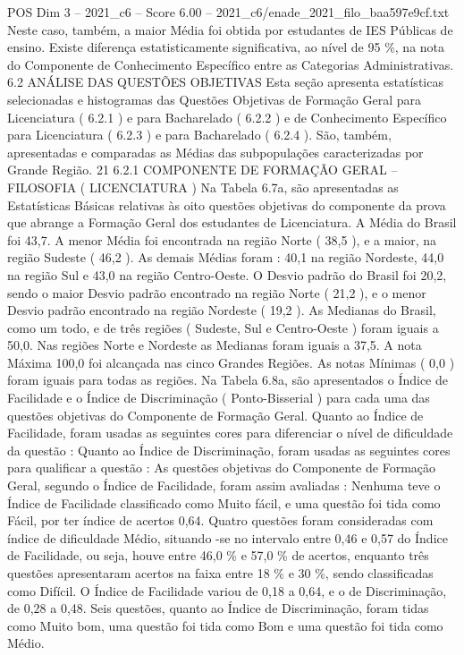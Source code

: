 \begin{textsample}{POS Dim 3 – 2021\_c6 – Score 6.00 – 2021\_c6/enade\_2021\_filo\_baa597e9cf.txt}
Neste caso, também, a maior Média foi obtida por estudantes de IES Públicas de ensino.
Existe diferença estatisticamente significativa, ao nível de 95 \%, na nota do Componente de Conhecimento Específico entre as Categorias Administrativas. 6.2 ANÁLISE DAS QUESTÕES OBJETIVAS Esta seção apresenta estatísticas selecionadas e histogramas das Questões Objetivas de Formação Geral para Licenciatura ( 6.2.1 ) e para Bacharelado ( 6.2.2 ) e de Conhecimento Específico para Licenciatura ( 6.2.3 ) e para Bacharelado ( 6.2.4 ).
São, também, apresentadas e comparadas as Médias das subpopulações caracterizadas por Grande Região. 21 6.2.1 COMPONENTE DE FORMAÇÃO GERAL – FILOSOFIA ( LICENCIATURA ) Na Tabela 6.7a, são apresentadas as Estatísticas Básicas relativas às oito questões objetivas do componente da prova que abrange a Formação Geral dos estudantes de Licenciatura.
A Média do Brasil foi 43,7.
A menor Média foi encontrada na região Norte ( 38,5 ), e a maior, na região Sudeste ( 46,2 ).
As demais Médias foram : 40,1 na região Nordeste, 44,0 na região Sul e 43,0 na região Centro-Oeste.
O Desvio padrão do Brasil foi 20,2, sendo o maior Desvio padrão encontrado na região Norte ( 21,2 ), e o menor Desvio padrão encontrado na região Nordeste ( 19,2 ).
As Medianas do Brasil, como um todo, e de três regiões ( Sudeste, Sul e Centro-Oeste ) foram iguais a 50,0.
Nas regiões Norte e Nordeste as Medianas foram iguais a 37,5.
A nota Máxima 100,0 foi alcançada nas cinco Grandes Regiões.
As notas Mínimas ( 0,0 ) foram iguais para todas as regiões.
Na Tabela 6.8a, são apresentados o Índice de Facilidade e o Índice de Discriminação ( Ponto-Bisserial ) para cada uma das questões objetivas do Componente de Formação Geral.
Quanto ao Índice de Facilidade, foram usadas as seguintes cores para diferenciar o nível de dificuldade da questão : Quanto ao Índice de Discriminação, foram usadas as seguintes cores para qualificar a questão : As questões objetivas do Componente de Formação Geral, segundo o Índice de Facilidade, foram assim avaliadas : Nenhuma teve o Índice de Facilidade classificado como Muito fácil, e uma questão foi tida como Fácil, por ter índice de acertos 0,64.
Quatro questões foram consideradas com índice de dificuldade Médio, situando -se no intervalo entre 0,46 e 0,57 do Índice de Facilidade, ou seja, houve entre 46,0 \% e 57,0 \% de acertos, enquanto três questões apresentaram acertos na faixa entre 18 \% e 30 \%, sendo classificadas como Difícil.
O Índice de Facilidade variou de 0,18 a 0,64, e o de Discriminação, de 0,28 a 0,48.
Seis questões, quanto ao Índice de Discriminação, foram tidas como Muito bom, uma questão foi tida como Bom e uma questão foi tida como Médio.

\end{textsample}
